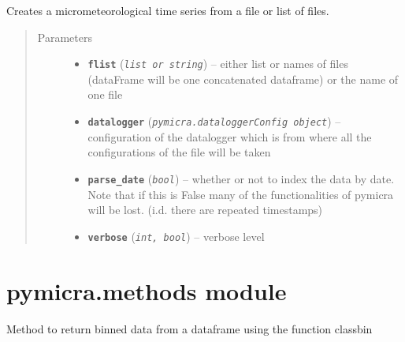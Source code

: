 \documentclass[a4paper,10pt,oneside]{sphinxmanual}
\begin{document}
\begin{fulllineitems}
\label{pymicra:pymicra.io.timeSeries}
Creates a micrometeorological time series from a file or list of files.
\begin{quote}\begin{description}
\item[{Parameters}] \leavevmode\begin{itemize}
\item {} 
\textbf{\texttt{flist}} (\emph{\texttt{list or string}}) -- either list or names of files (dataFrame will be one concatenated dataframe) or the name of one file

\item {} 
\textbf{\texttt{datalogger}} (\emph{\texttt{pymicra.dataloggerConfig object}}) -- configuration of the datalogger which is from where all the configurations of the file will be taken

\item {} 
\textbf{\texttt{parse\_date}} (\emph{\texttt{bool}}) -- whether or not to index the data by date. Note that if this is False many of the functionalities
of pymicra will be lost.
(i.d. there are repeated timestamps)

\item {} 
\textbf{\texttt{verbose}} (\emph{\texttt{int, bool}}) -- verbose level

\end{itemize}

\end{description}\end{quote}

\end{fulllineitems}



\section{pymicra.methods module}
\label{pymicra:module-pymicra.methods}\label{pymicra:pymicra-methods-module}

\begin{fulllineitems}
\label{pymicra:pymicra.methods.binwrapper}
Method to return binned data from a dataframe using the function classbin

\end{fulllineitems}
\end{document}
